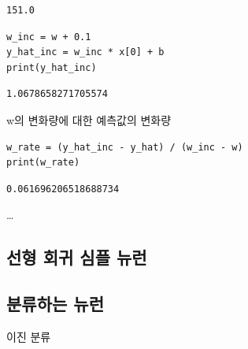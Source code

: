 \documentclass[11pt]{article}
\begin{document}
\begin{verbatim}
151.0
\end{verbatim}


\begin{verbatim}
w_inc = w + 0.1
y_hat_inc = w_inc * x[0] + b
print(y_hat_inc)
\end{verbatim}

\begin{verbatim}
1.0678658271705574
\end{verbatim}

w의 변화량에 대한 예측값의 변화량
\begin{verbatim}
w_rate = (y_hat_inc - y_hat) / (w_inc - w)
print(w_rate)
\end{verbatim}

\begin{verbatim}
0.061696206518688734
\end{verbatim}

\ldots{}

\subsection{선형 회귀 심플 뉴런}
\label{sec:org462ee5e}

\subsection{분류하는 뉴런}
\label{sec:org3e77c32}
이진 분류
\end{document}

